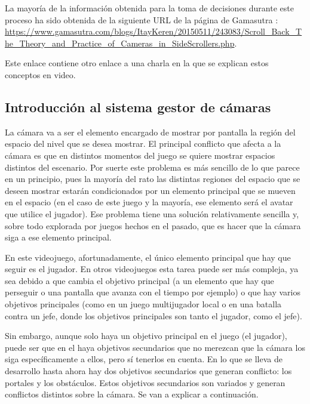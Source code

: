 La mayoría de la información obtenida para la toma de decisiones durante este proceso ha sido obtenida de la siguiente URL de la página de Gamasutra \cite{Gamasutra}:\\
 \url{https://www.gamasutra.com/blogs/ItayKeren/20150511/243083/Scroll_Back_The_Theory_and_Practice_of_Cameras_in_SideScrollers.php}.
 
Este enlace contiene otro enlace a una charla en la que se explican estos conceptos en video.

\subsection{Introducción al sistema gestor de cámaras}
La cámara va a ser el elemento encargado de mostrar por pantalla la región del espacio del nivel que se desea mostrar. El principal conflicto que afecta a la cámara es que en distintos momentos del juego se quiere mostrar espacios distintos del escenario. Por suerte este problema es más sencillo de lo que parece en un principio, pues la mayoría del rato las distintas regiones del espacio que se deseen mostrar estarán condicionados por un elemento principal que se mueven en el espacio (en el caso de este juego y la mayoría, ese elemento será el avatar que utilice el jugador). Ese problema tiene una solución relativamente sencilla y, sobre todo explorada por juegos hechos en el pasado, que es hacer que la cámara siga a ese elemento principal.

En este videojuego, afortunadamente, el único elemento principal que hay que seguir es el jugador. En otros videojuegos esta tarea puede ser más compleja, ya sea debido a que cambia el objetivo principal (a un elemento que hay que perseguir o una pantalla que avanza con el tiempo por ejemplo) o que hay varios objetivos principales (como en un juego multijugador local o en una batalla contra un jefe, donde los objetivos principales son tanto el jugador, como el jefe).

Sin embargo, aunque solo haya un objetivo principal en el juego (el jugador), puede ser que en el haya objetivos secundarios que no merezcan que la cámara los siga específicamente a ellos, pero sí tenerlos en cuenta. En lo que se lleva de desarrollo hasta ahora hay dos objetivos secundarios que generan conflicto: los portales y los obstáculos. Estos objetivos secundarios son variados y generan conflictos distintos sobre la cámara. Se van a explicar a continuación.

